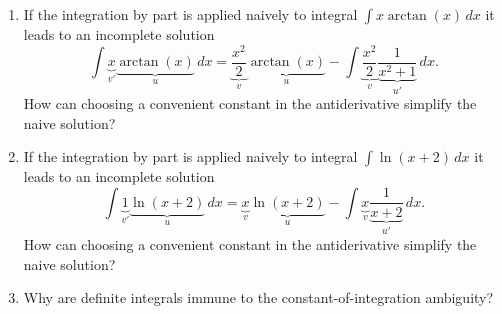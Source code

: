 \begin{enumerate}
  \item If the integration by part is applied naively to integral $\int x\arctan(x) \, dx$ it leads to an incomplete solution
    \[
      \int \underbrace{x}_{v'} \underbrace{\arctan(x)}_{u} \, dx
      = \underbrace{\frac{x^2}{2}}_{v} \underbrace{\arctan(x)}_{u} -
      \int \underbrace{\frac{x^2}{2}}_{v} \underbrace{\frac{1}{x^2+1}}_{u'}\,dx.
    \]
    How can choosing a convenient constant in the antiderivative simplify the naive solution?
  \item If the integration by part is applied naively to integral $\int \ln(x+2) \, dx$ it leads to an incomplete solution
    \[
      \int \underbrace{1}_{v'} \underbrace{\ln(x+2)}_{u} \, dx
      = \underbrace{x}_{v} \underbrace{\ln(x+2)}_{u} -
      \int \underbrace{x}_{v} \underbrace{\frac{1}{x+2}}_{u'} \, dx.
    \]
    How can choosing a convenient constant in the antiderivative simplify the naive solution?
  \item Why are definite integrals immune to the constant-of-integration ambiguity?
\end{enumerate}
